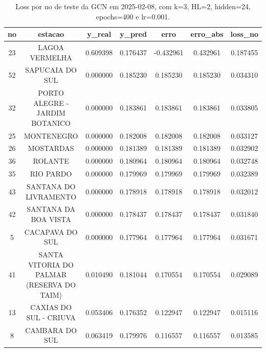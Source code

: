 \begin{table}[h]
\centering
\caption{Loss por no de teste da GCN em 2025-02-08, com k=3, HL=2, hidden=24, epochs=400 e lr=0.001.}
\label{tab:gcn_loss_k3_hl2_h24_e400_d20250208}
\begin{tabular}{ccccccc}
\toprule
no & estacao & y\_real & y\_pred & erro & erro\_abs & loss\_no \\
\midrule
23 & LAGOA VERMELHA & 0.609398 & 0.176437 & -0.432961 & 0.432961 & 0.187455 \\
52 & SAPUCAIA DO SUL & 0.000000 & 0.185230 & 0.185230 & 0.185230 & 0.034310 \\
32 & PORTO ALEGRE - JARDIM BOTANICO & 0.000000 & 0.183861 & 0.183861 & 0.183861 & 0.033805 \\
25 & MONTENEGRO & 0.000000 & 0.182008 & 0.182008 & 0.182008 & 0.033127 \\
26 & MOSTARDAS & 0.000000 & 0.181389 & 0.181389 & 0.181389 & 0.032902 \\
36 & ROLANTE & 0.000000 & 0.180964 & 0.180964 & 0.180964 & 0.032748 \\
35 & RIO PARDO & 0.000000 & 0.179969 & 0.179969 & 0.179969 & 0.032389 \\
43 & SANTANA DO LIVRAMENTO & 0.000000 & 0.178918 & 0.178918 & 0.178918 & 0.032012 \\
42 & SANTANA DA BOA VISTA & 0.000000 & 0.178437 & 0.178437 & 0.178437 & 0.031840 \\
5 & CACAPAVA DO SUL & 0.000000 & 0.177964 & 0.177964 & 0.177964 & 0.031671 \\
41 & SANTA VITORIA DO PALMAR (RESERVA DO TAIM) & 0.010490 & 0.181044 & 0.170554 & 0.170554 & 0.029089 \\
13 & CAXIAS DO SUL - CRIUVA & 0.053406 & 0.176352 & 0.122947 & 0.122947 & 0.015116 \\
8 & CAMBARA DO SUL & 0.063419 & 0.179976 & 0.116557 & 0.116557 & 0.013585 \\
\bottomrule
\end{tabular}
\end{table}
